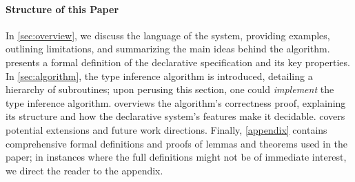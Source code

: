 \paragraph{\textbf{Structure of this Paper}}
In \cref{sec:overview}, we discuss the language of the \fexists system, providing
examples, outlining limitations, and summarizing the main ideas behind the
algorithm.  presents a formal definition of the
declarative specification and its key properties. In \cref{sec:algorithm}, the
type inference algorithm is introduced, detailing a hierarchy of subroutines;
upon perusing this section, one could \emph{implement} the type inference
algorithm.  overviews the algorithm's correctness proof,
explaining its structure and how the declarative system's features make it
decidable.  covers potential \fexists extensions and future
work directions. Finally, \cref{appendix} contains comprehensive formal
definitions and proofs of lemmas and theorems used in the paper; in instances
where the full definitions might not be of immediate interest, we direct the
reader to the appendix.

